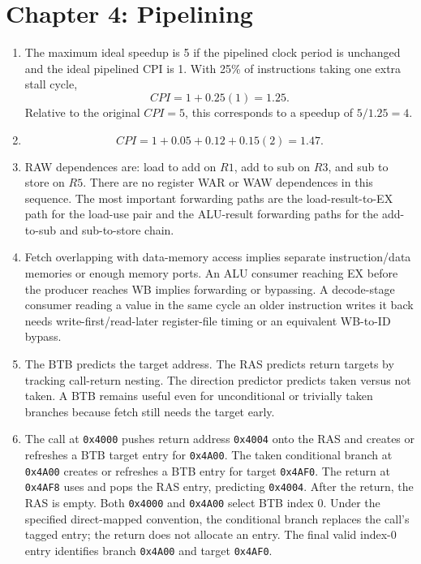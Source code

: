 \documentclass[11pt]{article}
\begin{document}
\section{Chapter 4: Pipelining}
\begin{enumerate}
    \item The maximum ideal speedup is 5 if the pipelined clock period is unchanged and the ideal pipelined CPI is 1.
    With 25\% of instructions taking one extra stall cycle,
    \[
        CPI=1+0.25(1)=1.25.
    \]
    Relative to the original \(CPI=5\), this corresponds to a speedup of \(5/1.25=4\).

    \item
    \[
        CPI=1+0.05+0.12+0.15(2)=1.47.
    \]

    \item RAW dependences are: load to add on \(R1\), add to sub on \(R3\), and sub to store on \(R5\).
    There are no register WAR or WAW dependences in this sequence.
    The most important forwarding paths are the load-result-to-EX path for the load-use pair and the ALU-result forwarding paths for the add-to-sub and sub-to-store chain.

    \item Fetch overlapping with data-memory access implies separate instruction/data memories or enough memory ports.
    An ALU consumer reaching EX before the producer reaches WB implies forwarding or bypassing.
    A decode-stage consumer reading a value in the same cycle an older instruction writes it back needs write-first/read-later register-file timing or an equivalent WB-to-ID bypass.

    \item The BTB predicts the target address.
    The RAS predicts return targets by tracking call-return nesting.
    The direction predictor predicts taken versus not taken.
    A BTB remains useful even for unconditional or trivially taken branches because fetch still needs the target early.

    \item The call at \texttt{0x4000} pushes return address \texttt{0x4004} onto the RAS and creates or refreshes a BTB target entry for \texttt{0x4A00}.
    The taken conditional branch at \texttt{0x4A00} creates or refreshes a BTB entry for target \texttt{0x4AF0}.
    The return at \texttt{0x4AF8} uses and pops the RAS entry, predicting \texttt{0x4004}.
    After the return, the RAS is empty.
    Both \texttt{0x4000} and \texttt{0x4A00} select BTB index 0.
    Under the specified direct-mapped convention, the conditional branch replaces the call's tagged entry; the return does not allocate an entry.
    The final valid index-0 entry identifies branch \texttt{0x4A00} and target \texttt{0x4AF0}.


\end{enumerate}
\end{document}
